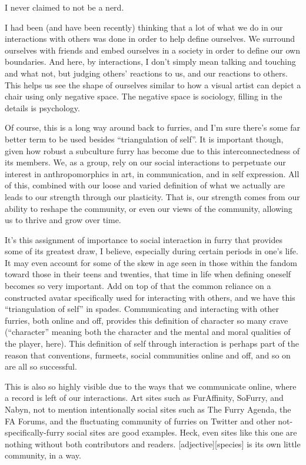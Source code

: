 I never claimed to not be a nerd.

I had been (and have been recently) thinking that a lot of what we do in our interactions with others was done in order to help define ourselves.  We surround ourselves with friends and embed ourselves in a society in order to define our own boundaries.  And here, by interactions, I don't simply mean talking and touching and what not, but judging others' reactions to us, and our reactions to others.  This helps us see the shape of ourselves similar to how a visual artist can depict a chair using only negative space.  The negative space is sociology, filling in the details is psychology.

Of course, this is a long way around back to furries, and I'm sure there's some far better term to be used besides ``triangulation of self''.  It is important though, given how robust a subculture furry has become due to this interconnectedness of its members.  We, as a group, rely on our social interactions to perpetuate our interest in anthropomorphics in art, in communication, and in self expression.  All of this, combined with our loose and varied definition of what we actually are leads to our strength through our plasticity.  That is, our strength comes from our ability to reshape the community, or even our views of the community, allowing us to thrive and grow over time.

It's this assignment of importance to social interaction in furry that provides some of its greatest draw, I believe, especially during certain periods in one's life.  It may even account for some of the skew in age seen in those within the fandom toward those in their teens and twenties, that time in life when defining oneself becomes so very important.  Add on top of that the common reliance on a constructed avatar specifically used for interacting with others, and we have this ``triangulation of self'' in spades.  Communicating and interacting with other furries, both online and off, provides this definition of character so many crave (``character'' meaning both the character and the mental and moral qualities of the player, here).  This definition of self through interaction is perhaps part of the reason that conventions, furmeets, social communities online and off, and so on are all so successful.

This is also so highly visible due to the ways that we communicate online, where a record is left of our interactions.  Art sites such as FurAffinity, SoFurry, and Nabyn, not to mention intentionally social sites such as The Furry Agenda, the FA Forums, and the fluctuating community of furries on Twitter and other not-specifically-furry social sites are good examples.  Heck, even sites like this one are nothing without both contributors and readers.  [adjective][species] is its own little community, in a way.

